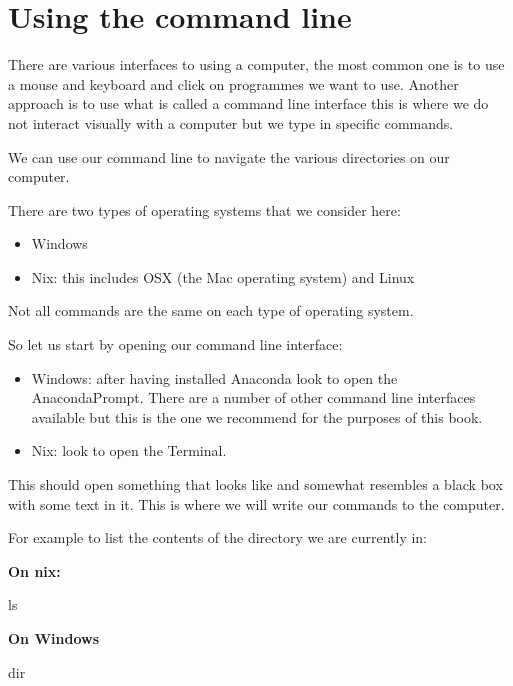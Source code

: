 \section{Using the command line}\label{sec:using-the-command-line}

There are various interfaces to using a computer, the most common one is to use
a mouse and keyboard and click on programmes we want to use. Another approach is
to use what is called a command line interface this is where we do not interact
visually with a computer but we type in specific commands.


We can use our command line to navigate the various directories on our
computer.

There are two types of operating systems that we consider here:

\begin{itemize}
    \item Windows
    \item Nix: this includes OSX (the Mac operating system) and Linux
\end{itemize}

Not all commands are the same on each type of operating system.

So let us start by opening our command line interface:

\begin{itemize}
    \item Windows: after having installed Anaconda look to open the
        AnacondaPrompt. There are a number of other command line interfaces
        available but this is the one we recommend for the purposes of this
        book.
    \item Nix: look to open the Terminal.
\end{itemize}

This should open something that looks like %
and somewhat resembles a black box with some text in it.
This is where we will write our commands to the computer.

For example to list the contents of the directory we are currently in:

\textbf{On nix:}

\begin{cliin}
ls
\end{cliin}

\textbf{On Windows}

\begin{cliin}
dir
\end{cliin}

